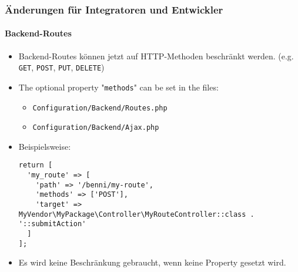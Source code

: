 %

\begin{frame}[fragile]
	\frametitle{Änderungen für Integratoren und Entwickler}
	\framesubtitle{Backend-Routes}


	\begin{itemize}
		\item Backend-Routes können jetzt auf HTTP-Methoden beschränkt werden.\newline
			\small(e.g. \texttt{GET}, \texttt{POST}, \texttt{PUT}, \texttt{DELETE})
		\item The optional property "\texttt{methods}" can be set in the files:
			\begin{itemize}\smaller
				\item \texttt{Configuration/Backend/Routes.php}
				\item \texttt{Configuration/Backend/Ajax.php}
			\end{itemize}
			\vspace{0.2cm}
		\item Beispielsweise:
\begin{lstlisting}
return [
  'my_route' => [
    'path' => '/benni/my-route',
    'methods' => ['POST'],
    'target' => MyVendor\MyPackage\Controller\MyRouteController::class . '::submitAction'
  ]
];
\end{lstlisting}

		\item Es wird keine Beschränkung gebraucht, wenn keine Property gesetzt wird.

	\end{itemize}

\end{frame}

